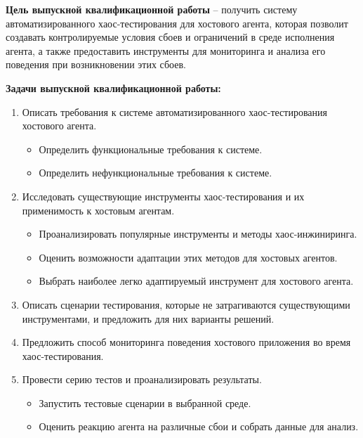 \newpage

\textbf{Цель выпускной квалификационной работы} -- получить систему автоматизированного хаос-тестирования
для хостового агента, которая позволит создавать контролируемые условия сбоев и ограничений в среде исполнения агента,
а также предоставить инструменты для мониторинга и анализа его поведения при возникновении этих сбоев.

\textbf{Задачи выпускной квалификационной работы:}

\begin{enumerate}
  \item Описать требования к системе автоматизированного хаос-тестирования хостового агента.
  \begin{itemize}
    \item Определить функциональные требования к системе.
    \item Определить нефункциональные требования к системе.
  \end{itemize}
  \item Исследовать существующие инструменты хаос-тестирования и их применимость к хостовым агентам.
    \begin{itemize}
      \item Проанализировать популярные инструменты и методы хаос-инжиниринга.
      \item Оценить возможности адаптации этих методов для хостовых агентов.
      \item Выбрать наиболее легко адаптируемый инструмент для хостового агента.
    \end{itemize}
  \item Описать сценарии тестирования, которые не затрагиваются существующими инструментами, и предложить для них варианты решений.
  \item Предложить способ мониторинга поведения хостового приложения во время хаос-тестирования.
  \item Провести серию тестов и проанализировать результаты.
    \begin{itemize}
      \item Запустить тестовые сценарии в выбранной среде.
      \item Оценить реакцию агента на различные сбои и собрать данные для анализ.
    \end{itemize}
\end{enumerate}

